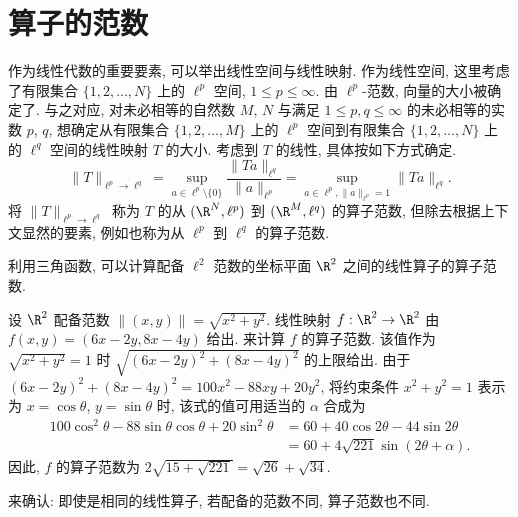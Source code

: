 \section{算子的范数}\label{sec:1.3}







作为线性代数的重要要素, 可以举出线性空间与线性映射. 作为线性空间, 这里考虑了有限集合 $\{1, 2, \ldots, N\}$ 上的 $\ell^{p}$ 空间, $1 \leq p \leq \infty$. 由 $\ell^{p}$-范数, 向量的大小被确定了. 与之对应, 对未必相等的自然数 $M$, $N$ 与满足 $1 \leq p, q \leq \infty$ 的未必相等的实数 $p$, $q$, 想确定从有限集合 $\{1, 2, \ldots, M\}$ 上的 $\ell^{p}$ 空间到有限集合 $\{1, 2, \ldots, N\}$ 上的 $\ell^{q}$ 空间的线性映射 $T$ 的大小. 考虑到 $T$ 的线性, 具体按如下方式确定.
\[
\| T \|_{\ell^{p} \to \ell^{q}} = \sup_{a \in \ell^{p} \setminus \{0\}} \frac{\| T a \|_{\ell^{q}}}{\| a \|_{\ell^{p}}} = \sup_{a \in \ell^{p}, \| a \|_{\ell^{p}} = 1} \| T a \|_{\ell^{q}}.
\]
将 $\|T\|_{\ell^{p} \to \ell^{q}}$ 称为 $T$ 的从 $(\R^{N}, \ell^{p})$ 到 $(\R^{M}, \ell^{q})$ 的算子范数, 但除去根据上下文显然的要素, 例如也称为从 $\ell^{p}$ 到 $\ell^{q}$ 的算子范数.

利用三角函数, 可以计算配备 $\ell^{2}$ 范数的坐标平面 $\R^{2}$ 之间的线性算子的算子范数.

\begin{example}\label{exa:1.3}
设 $\R^{2}$ 配备范数 $\|(x, y)\| = \sqrt{x^{2} + y^{2}}$. 线性映射 $f: \R^{2} \to \R^{2}$ 由 $f(x, y) = (6x - 2y, 8x - 4y)$ 给出. 来计算 $f$ 的算子范数. 该值作为 $\sqrt{x^{2} + y^{2}} = 1$ 时 $\sqrt{(6x-2y)^{2} + (8x-4y)^{2}}$ 的上限给出. 由于 $(6x-2y)^{2} + (8x-4y)^{2} = 100x^{2} - 88xy + 20y^{2}$, 将约束条件 $x^{2} + y^{2} = 1$ 表示为 $x = \cos\theta$, $y = \sin\theta$ 时, 该式的值可用适当的 $\alpha$ 合成为
\begin{align*}
100\cos^{2}\theta - 88\sin\theta\cos\theta + 20\sin^{2}\theta & = 60 + 40\cos 2\theta - 44\sin 2\theta \\
& = 60 + 4\sqrt{221}\sin(2\theta + \alpha).
\end{align*}
因此, $f$ 的算子范数为 $2\sqrt{15 + \sqrt{221}} = \sqrt{26} + \sqrt{34}$.
\end{example}

来确认: 即使是相同的线性算子, 若配备的范数不同, 算子范数也不同.

